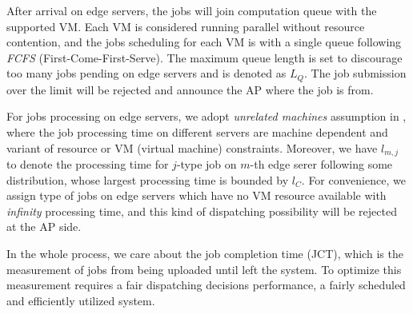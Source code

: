 After arrival on edge servers, the jobs will join computation queue with the supported VM.
Each VM is considered running parallel without resource contention, and the jobs scheduling for each VM is with a single queue following \emph{FCFS} (First-Come-First-Serve).
{\color{red}The maximum queue length is set to discourage too many jobs pending on edge servers and is denoted as $L_Q$. The job submission over the limit will be rejected and announce the AP where the job is from.}

{\color{red}For jobs processing on edge servers, we adopt \emph{unrelated machines} assumption in \cite{tan-online}, where the job processing time on different servers are machine dependent and variant of resource or VM (virtual machine) constraints.
Moreover, we have $l_{m,j}$ to denote the processing time for $j$-type job on $m$-th edge serer following some distribution, whose largest processing time is bounded by $l_C$.}
For convenience, we assign type of jobs on edge servers which have no VM resource available with \emph{infinity} processing time, and this kind of dispatching possibility will be rejected at the AP side.

In the whole process, we care about the job completion time (JCT), which is the measurement of jobs from being uploaded until left the system. To optimize this measurement requires a fair dispatching decisions performance, a fairly scheduled and efficiently utilized system.

